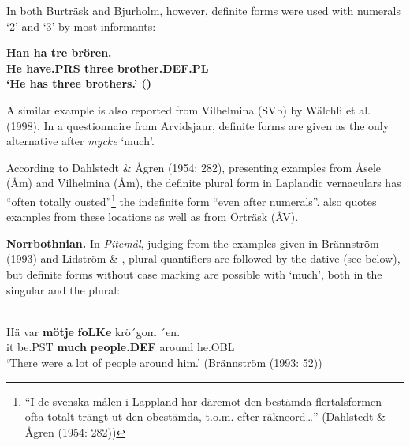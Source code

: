 \z

In both Burträsk and Bjurholm, however, definite forms were used with numerals ‘2’ and ‘3’ by most informants:


\ea \label{} 
\gll \bfseries Han  ha  tre  brören.\\
\bfseries He  have.PRS  three  brother.DEF.PL\\
\glt ‘He has three brothers.’ (\citet[24]{BergholmEtAl1999})

\z

A similar example is also reported from Vilhelmina (SVb) by Wälchli et al. (1998). In a questionnaire from Arvidsjaur, definite forms are given as the only alternative after \textit{mycke} ‘much’. 


According to Dahlstedt \& Ågren (1954: 282), presenting examples from Åsele (Åm) and Vilhelmina (Åm), the definite plural form in Laplandic vernaculars has “often totally ousted”\footnote{ “I de svenska målen i Lappland har däremot den bestämda flertalsformen ofta totalt trängt ut den obestämda, t.o.m. efter räkneord…” (Dahlstedt \& Ågren (1954: 282))} the indefinite form “even after numerals”.  \citet[17]{Delsing2003a} also quotes examples from these locations as well as from Örträsk (ÅV). 


\textbf{Norrbothnian.} In \textit{Pitemål}, judging from the examples given in Brännström (1993) and Lidström \& \citet{Berglund1991}, plural quantifiers are followed by the dative (see below), but definite forms without case marking are possible with  ‘much’, both in the singular and the plural:


\ea\label{}
\\
\gll Hä  var  \textbf{mö{\textasciigrave}tje} \textbf{  foLKe} krö´gom  ´en.\\
it  be.PST  \textbf{much} \textbf{people.DEF} around  he.OBL\\
\glt ‘There were a lot of people around him.’ (Brännström (1993: 52))

